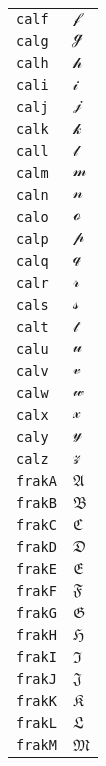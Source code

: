 \begin{longtable}{ll}
\texttt{calf}&${}{\mathcal{f}}{}$\\
\texttt{calg}&${}{\mathcal{g}}{}$\\
\texttt{calh}&${}{\mathcal{h}}{}$\\
\texttt{cali}&${}{\mathcal{i}}{}$\\
\texttt{calj}&${}{\mathcal{j}}{}$\\
\texttt{calk}&${}{\mathcal{k}}{}$\\
\texttt{call}&${}{\mathcal{l}}{}$\\
\texttt{calm}&${}{\mathcal{m}}{}$\\
\texttt{caln}&${}{\mathcal{n}}{}$\\
\texttt{calo}&${}{\mathcal{o}}{}$\\
\texttt{calp}&${}{\mathcal{p}}{}$\\
\texttt{calq}&${}{\mathcal{q}}{}$\\
\texttt{calr}&${}{\mathcal{r}}{}$\\
\texttt{cals}&${}{\mathcal{s}}{}$\\
\texttt{calt}&${}{\mathcal{t}}{}$\\
\texttt{calu}&${}{\mathcal{u}}{}$\\
\texttt{calv}&${}{\mathcal{v}}{}$\\
\texttt{calw}&${}{\mathcal{w}}{}$\\
\texttt{calx}&${}{\mathcal{x}}{}$\\
\texttt{caly}&${}{\mathcal{y}}{}$\\
\texttt{calz}&${}{\mathcal{z}}{}$\\
\texttt{frakA}&${}{\mathfrak{A}} {}$\\
\texttt{frakB}&${}{\mathfrak{B}} {}$\\
\texttt{frakC}&${}{\mathfrak{C}} {}$\\
\texttt{frakD}&${}{\mathfrak{D}} {}$\\
\texttt{frakE}&${}{\mathfrak{E}} {}$\\
\texttt{frakF}&${}{\mathfrak{F}} {}$\\
\texttt{frakG}&${}{\mathfrak{G}} {}$\\
\texttt{frakH}&${}{\mathfrak{H}} {}$\\
\texttt{frakI}&${}{\mathfrak{I}} {}$\\
\texttt{frakJ}&${}{\mathfrak{J}} {}$\\
\texttt{frakK}&${}{\mathfrak{K}} {}$\\
\texttt{frakL}&${}{\mathfrak{L}} {}$\\
\texttt{frakM}&${}{\mathfrak{M}} {}$\\

\end{longtable}
